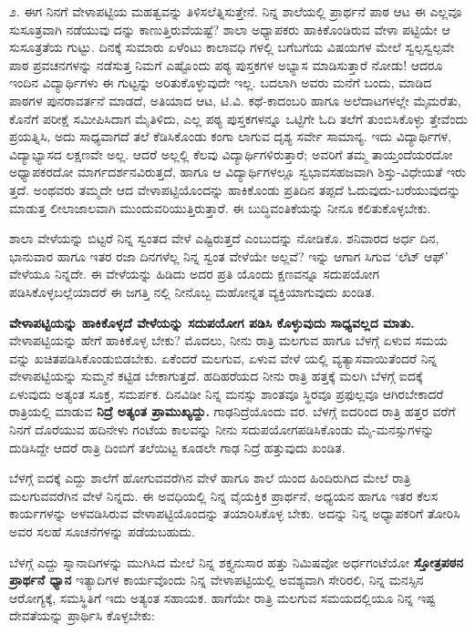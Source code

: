 ೨. ಈಗ ನಿನಗೆ ವೇಳಾಪಟ್ಟಿಯ ಮಹತ್ವವನ್ನು ತಿಳಿಸಲೆತ್ನಿಸುತ್ತೇನೆ. ನಿನ್ನ ಶಾಲೆಯಲ್ಲಿ ಪ್ರಾರ್ಥನೆ ಪಾಠ ಆಟ ಈ ಎಲ್ಲವೂ ಸುಸೂತ್ರವಾಗಿ ನಡೆಯುವು ದನ್ನು ಕಾಣುತ್ತಿರುವೆಯಷ್ಟೆ? ಶಾಲಾ ಅಧ್ಯಾಪಕರು ಹಾಕಿಕೊಂಡಿರುವ ವೇಳಾ ಪಟ್ಟಿಯೇ ಆ ಸುಸೂತ್ರತೆಯ ಗುಟ್ಟು. ದಿನಕ್ಕೆ ಸುಮಾರು ಏಳೆಂಟು ಕಾಲಾವಧಿ ಗಳಲ್ಲಿ ಬಗೆಬಗೆಯ ವಿಷಯಗಳ ಮೇಲೆ ಸ್ವಲ್ಪಸ್ವಲ್ಪವೇ ಪಾಠ ಪ್ರವಚನಗಳನ್ನು ನಡೆಸುತ್ತ ನಿಮಗೆ ಎಷ್ಟೊಂದು ಪಠ್ಯ ಪುಸ್ತಕಗಳ ಅಭ್ಯಾಸ ಮಾಡಿಸುತ್ತಾರೆ ನೋಡು! ಆದರೂ ಇಂದಿನ ವಿದ್ಯಾರ್ಥಿಗಳು ಈ ಗುಟ್ಟನ್ನು ಅರಿತುಕೊಳ್ಳುವುದೇ ಇಲ್ಲ. ಬದಲಾಗಿ ಅವರು ಮನೆಗೆ ಬಂದು, ಮಾಡಿದ ಪಾಠಗಳ ಪುನರಾವರ್ತನೆ ಮಾಡದೆ, ಅತಿಯಾದ ಆಟ, ಟಿ.ವಿ. ಕಥೆ-ಕಾದಂಬರಿ ಹಾಗೂ ಅಲೆದಾಟಗಳಲ್ಲೇ ಮೈಮರೆತು, ಕೊನೆಗೆ ಪರೀಕ್ಷೆ ಸಮೀಪಿಸಿದಾಗ ಮೈತಿಳಿದು, ಎಲ್ಲ ಪಠ್ಯ ಪುಸ್ತಕಗಳನ್ನೂ ಒಟ್ಟಿಗೇ ಓದಿ ತಲೆಗೆ ತುಂಬಿಸಿಕೊಳ್ಳು ತ್ತೇವೆಂದು ಪ್ರಯತ್ನಿಸಿ, ಅದು ಸಾಧ್ಯವಾಗದೆ ತಲೆ ಕೆಡಿಸಿಕೊಂಡು ಕಂಗಾ ಲಾಗುವ ದೃಶ್ಯ ಸರ್ವೇ ಸಾಮಾನ್ಯ. ಇದು ವಿದ್ಯಾರ್ಥಿಗಳ, ವಿದ್ಯಾಭ್ಯಾಸದ ಲಕ್ಷಣವೇ ಅಲ್ಲ. ಆದರೆ ಅಲ್ಲಲ್ಲಿ ಕೆಲವು ವಿದ್ಯಾರ್ಥಿಗಳಿರುತ್ತಾರೆ; ಅವರಿಗೆ ತಮ್ಮ ತಾಯ್ತಂದೆಯರದೋ ಅಧ್ಯಾಪಕರದೋ ಮಾರ್ಗದರ್ಶನವಿರುತ್ತದೆ, ಹಾಗೂ ಆ ವಿದ್ಯಾರ್ಥಿಗಳಲ್ಲೂ ಸ್ವಭಾವಸಹಜವಾಗಿ ಶಿಸ್ತು-ವಿಧೇಯತೆ ಇರು ತ್ತದೆ. ಅಂಥವರು ತಮ್ಮದೇ ಆದ ವೇಳಾಪಟ್ಟಿಯೊಂದನ್ನು ಹಾಕಿಕೊಂಡು ಪ್ರತಿದಿನ ತಪ್ಪದೆ ಓದುವುದು-ಬರೆಯುವುದನ್ನು ಮಾಡುತ್ತ ಲೀಲಾಜಾಲವಾಗಿ ಮುಂದುವರಿಯುತ್ತಿರುತ್ತಾರೆ. ಈ ಬುದ್ಧಿವಂತಿಕೆಯನ್ನು ನೀನೂ ಕಲಿತುಕೊಳ್ಳಬೇಕು.

ಶಾಲಾ ವೇಳೆಯನ್ನು ಬಿಟ್ಟರೆ ನಿನ್ನ ಸ್ವಂತದ ವೇಳೆ ಎಷ್ಟಿರುತ್ತದೆ ಎಂಬುದನ್ನು ನೋಡಿಕೊ. ಶನಿವಾರದ ಅರ್ಧ ದಿನ, ಭಾನುವಾರ ಹಾಗೂ ಇತರ ರಜಾ ದಿನಗಳೆಲ್ಲ ನಿನ್ನ ಸ್ವಂತ ವೇಳೆಯೇ ಅಲ್ಲವೆ? ಇನ್ನು ಆಗಾಗ ಸಿಗುವ ‘ಲೆಟ್ ಆಫ್​’ ವೇಳೆಯೂ ನಿನ್ನದೇ. ಈ ವೇಳೆಯನ್ನು ಹಿಡಿದು ಅದರ ಪ್ರತಿ ಯೊಂದು ಕ್ಷಣವನ್ನೂ ಸದುಪಯೋಗ ಪಡಿಸಿಕೊಳ್ಳಬಲ್ಲೆಯಾದರೆ ಈ ಜಗತ್ತಿ ನಲ್ಲಿ ನೀನೊಬ್ಬ ಮಹೋನ್ನತ ವ್ಯಕ್ತಿಯಾಗುವುದು ಖಂಡಿತ.

\textbf{ವೇಳಾಪಟ್ಟಿಯನ್ನು ಹಾಕಿಕೊಳ್ಳದೆ ವೇಳೆಯನ್ನು ಸದುಪಯೋಗ ಪಡಿಸಿ ಕೊಳ್ಳುವುದು ಸಾಧ್ಯವಲ್ಲದ ಮಾತು.} ವೇಳಾಪಟ್ಟಿಯನ್ನು ಹೇಗೆ ಹಾಕಿಕೊಳ್ಳ ಬೇಕು? ಮೊದಲು, ನೀನು ರಾತ್ರಿ ಮಲಗುವ ಹಾಗೂ ಬೆಳಗ್ಗೆ ಏಳುವ ಸಮಯ ವನ್ನು ಖಚಿತಪಡಿಸಿಕೊಂಡುಬಿಡಬೇಕು. ಏಕೆಂದರೆ ಮಲಗುವ, ಏಳುವ ವೇಳೆ ಯಲ್ಲಿ ವ್ಯತ್ಯಾಸವಾಯಿತೆಂದರೆ ನಿನ್ನ ವೇಳಾಪಟ್ಟಿಯನ್ನು ಸುಮ್ಮನೆ ಕಟ್ಟಿಡ ಬೇಕಾಗುತ್ತದೆ. ಹದಿಹರೆಯದ ನೀನು ರಾತ್ರಿ ಹತ್ತಕ್ಕೆ ಮಲಗಿ ಬೆಳಗ್ಗೆ ಐದಕ್ಕೆ ಏಳುವುದು ಅತ್ಯಂತ ಸೂಕ್ತ, ಸಮರ್ಪಕ. ದಿನವಿಡೀ ನಿನ್ನ ಮನಸ್ಸು ಶಾಂತವೂ ಸ್ಥಿರವೂ ಪ್ರಫುಲ್ಲವೂ ಆಗಿರಬೇಕಾದರೆ ರಾತ್ರಿಯಲ್ಲಿ ಮಾಡುವ \textbf{ನಿದ್ರೆ ಅತ್ಯಂತ ಪ್ರಾಮುಖ್ಯದ್ದು.} ಗಾಢನಿದ್ರೆಯೊಂದು ವರ. ಬೆಳಗ್ಗೆ ಐದರಿಂದ ರಾತ್ರಿ ಹತ್ತರ ವರೆಗೆ ನಿನಗೆ ದೊರೆಯುವ ಹದಿನೇಳು ಗಂಟೆಯ ಕಾಲವನ್ನು ನೀನು ಸದುಪಯೋಗಪಡಿಸಿಕೊಂಡು ಮೈ-ಮನಸ್ಸುಗಳನ್ನು ದುಡಿಸಿದ್ದೇ ಆದರೆ ರಾತ್ರಿ ದಿಂಬಿಗೆ ತಲೆಯಿಟ್ಟ ಕೂಡಲೇ ಗಾಢ ನಿದ್ರೆ ಹತ್ತುವುದು ಖಂಡಿತ.

ಬೆಳಗ್ಗೆ ಐದಕ್ಕೆ ಎದ್ದು ಶಾಲೆಗೆ ಹೋಗುವವರೆಗಿನ ವೇಳೆ ಹಾಗೂ ಶಾಲೆ ಯಿಂದ ಹಿಂದಿರುಗಿದ ಮೇಲೆ ರಾತ್ರಿ ಮಲಗುವವರೆಗಿನ ವೇಳೆ ನಿನ್ನದು. ಈ ಅವಧಿಯಲ್ಲಿ ನಿನ್ನ ವೈಯಕ್ತಿಕ ಪ್ರಾರ್ಥನೆ, ಅಧ್ಯಯನ ಹಾಗೂ ಇತರ ಕೆಲಸ ಕಾರ್ಯಗಳನ್ನು ಅಳವಡಿಸಿರುವ ವೇಳಾಪಟ್ಟಿಯೊಂದನ್ನು ತಯಾರಿಸಿಕೊಳ್ಳ ಬೇಕು. ಅದನ್ನು ನಿನ್ನ ಅಧ್ಯಾಪಕರಿಗೆ ತೋರಿಸಿ ಅವರ ಸಲಹೆ ಸೂಚನೆಗಳನ್ನು ಪಡೆಯಬಹುದು.

ಬೆಳಗ್ಗೆ ಎದ್ದು ಸ್ನಾನಾದಿಗಳನ್ನು ಮುಗಿಸಿದ ಮೇಲೆ ನಿನ್ನ ಶಕ್ತ್ಯನುಸಾರ ಹತ್ತು ನಿಮಿಷವೋ ಅರ್ಧಗಂಟೆಯೋ \textbf{ಸ್ತೋತ್ರಪಠನ ಪ್ರಾರ್ಥನೆ ಧ್ಯಾನ} ಇತ್ಯಾದಿಗಳ ಕಾರ್ಯವೊಂದು ನಿನ್ನ ವೇಳಾಪಟ್ಟಿಯಲ್ಲಿ ಅವಶ್ಯವಾಗಿ ಸೇರಿರಲಿ, ನಿನ್ನ ಮನಸ್ಸಿನ ಆರೋಗ್ಯಕ್ಕೆ, ಸಮಸ್ಥಿತಿಗೆ ಇದು ಅತ್ಯಂತ ಸಹಾಯಕ. ಹಾಗೆಯೇ ರಾತ್ರಿ ಮಲಗುವ ಸಮಯದಲ್ಲಿಯೂ ನಿನ್ನ ಇಷ್ಟ ದೇವತೆಯನ್ನು ಪ್ರಾರ್ಥಿಸಿ ಕೊಳ್ಳಬೇಕು: 

